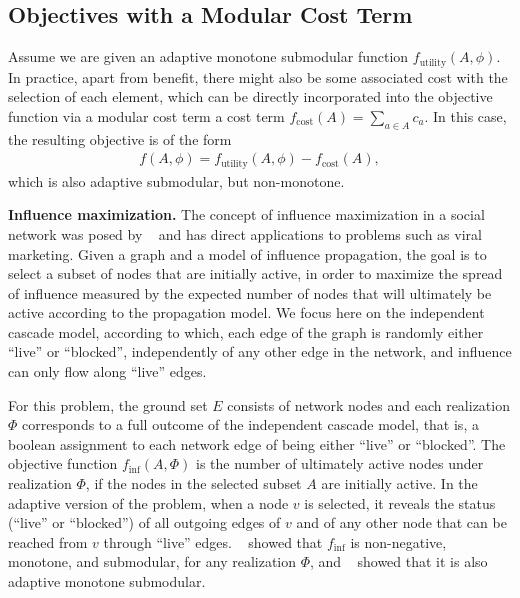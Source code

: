 \documentclass{article}
\newcommand{\citet}[1]{\citeauthor{#1}~\shortcite{#1}}
\renewcommand{\paragraph}[1]{\vspace{0.3em}\noindent\textbf{#1.}\makebox[0.5em]{}}
\begin{document}
\subsection{Objectives with a Modular Cost Term}
Assume we are given an adaptive monotone submodular function $f_{\textrm{utility}}(A, \phi)$.
In practice, apart from benefit, there might also be some associated cost with the selection of each element, which can be directly incorporated into the objective function via a modular cost term a cost term $f_{\textrm{cost}}(A) = \sum_{a \in A} c_a$.
In this case, the resulting objective is of the form
\begin{align} \label{eq:cost}
  f(A, \phi) = f_{\textrm{utility}}(A, \phi) - f_{\textrm{cost}}(A),
\end{align}
which is also adaptive submodular, but non-monotone.

\paragraph{Influence maximization}
The concept of influence maximization in a social network was posed by \citet{kempe03} and has direct applications to problems such as viral marketing.
Given a graph and a model of influence propagation, the goal is to select a subset of nodes that are initially active, in order to maximize the spread of influence measured by the expected number of nodes that will ultimately be active according to the propagation model.
We focus here on the independent cascade model, according to which, each edge of the graph is randomly either ``live'' or ``blocked'', independently of any other edge in the network, and influence can only flow along ``live'' edges.

For this problem, the ground set $E$ consists of network nodes and each realization $\Phi$ corresponds to a full outcome of the independent cascade model, that is, a boolean assignment to each network edge of being either ``live'' or ``blocked''.
The objective function $f_{\textrm{inf}}(A, \Phi)$ is the number of ultimately active nodes under realization $\Phi$, if the nodes in the selected subset $A$ are initially active.
In the adaptive version of the problem, when a node $v$ is selected, it reveals the status (``live'' or ``blocked'') of all outgoing edges of $v$ and of any other node that can be reached from $v$ through ``live'' edges.
\citet{kempe03} showed that $f_{\textrm{inf}}$ is non-negative, monotone, and submodular, for any realization $\Phi$, and \citet{golovin11} showed that it is also adaptive monotone submodular.
\end{document}

